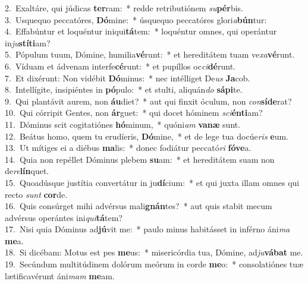 {2.~}Exaltáre, qui júdicas \textbf{ter}ram:~* redde retributiónem \textit{su}\textbf{pér}bis.\\
{3.~}Usquequo peccatóres, \textbf{Dó}mine:~* úsquequo peccatóres glori\textit{a}\textbf{bún}tur:\\
{4.~}Effabúntur et loquéntur iniqui\textbf{tá}tem:~* loquéntur omnes, qui operántur in\textit{ju}\textbf{stí}\textbf{ti}am?\\
{5.~}Pópulum tuum, Dómine, humilia\textbf{vé}runt:~* et hereditátem tuam ve\textit{xa}\textbf{vé}runt.\\
{6.~}Víduam et ádvenam interfe\textbf{cé}runt:~* et pupíllos oc\textit{ci}\textbf{dé}runt.\\
{7.~}Et dixérunt: Non vidébit \textbf{Dó}minus:~* nec intélliget De\textit{us} \textbf{Ja}cob.\\
{8.~}Intellígite, insipiéntes in \textbf{pó}pulo:~* et stulti, aliquán\textit{do} \textbf{sá}\textbf{pi}te.\\
{9.~}Qui plantávit aurem, non \textbf{áu}diet?~* aut qui finxit óculum, non \textit{con}\textbf{sí}\textbf{de}rat?\\
{10.~}Qui córripit Gentes, non \textbf{ár}guet:~* qui docet hóminem \textit{sci}\textbf{én}\textbf{ti}am?\\
{11.~}Dóminus scit cogitatiónes \textbf{hó}minum,~* quóni\textit{am} \textbf{va}\textbf{næ} sunt.\\
{12.~}Beátus homo, quem tu erudíeris, \textbf{Dó}mine,~* et de lege tua docúe\textit{ris} \textbf{e}um.\\
{13.~}Ut mítiges ei a diébus \textbf{ma}lis:~* donec fodiátur peccató\textit{ri} \textbf{fó}\textbf{ve}a.\\
{14.~}Quia non repéllet Dóminus plebem \textbf{su}am:~* et hereditátem suam non de\textit{re}\textbf{lín}quet.\\
{15.~}Quoadúsque justítia convertátur in ju\textbf{dí}cium:~* et qui juxta illam omnes qui recto \textit{sunt} \textbf{cor}de.\\
{16.~}Quis consúrget mihi advérsus mali\textbf{gnán}tes?~* aut quis stabit mecum advérsus operántes ini\textit{qui}\textbf{tá}tem?\\
{17.~}Nisi quia Dóminus ad\textbf{jú}vit me:~* paulo minus habitásset in inférno áni\textit{ma} \textbf{me}a.\\
{18.~}Si dicébam: Motus est pes \textbf{me}us:~* misericórdia tua, Dómine, ad\textit{ju}\textbf{vá}\textbf{bat} me.\\
{19.~}Secúndum multitúdinem dolórum meórum in corde \textbf{me}o:~* consolatiónes tuæ lætificavérunt áni\textit{mam} \textbf{me}am.\\
